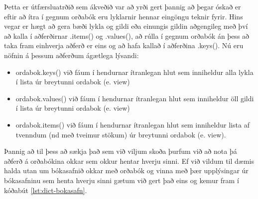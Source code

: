 Þetta er útfærsluatrðið sem ákveðið var að yrði gert þannig að þegar óskað er eftir að ítra í gegnum orðabók eru lyklarnir hennar eingöngu teknir fyrir.
Hins vegar er hægt að gera bæði lykla og gildi eða einungis gildin aðgengileg með því að kalla í aðferðirnar .items() og .values(), að rúlla í gegnum orðabók án þess að taka fram einhverja aðferð er eins og að hafa kallað í aðferðina .keys().
Nú eru nöfnin á þessum aðferðum ágætlega lýsandi:

\begin{itemize}
	\item ordabok.keys() við fáum í hendurnar ítranlegan hlut sem inniheldur alla lykla í lista úr breytunni ordabok (e. view)
	\item ordabok.values() við fáum í hendurnar ítranlegan hlut sem inniheldur öll gildi í lista úr breytunni ordabok (e. view)
	\item ordabok.items() við fáum í hendurnar ítranlegan hlut sem inniheldur lista af tvenndum (nd með tveimur stökum) úr breytunni ordabok (e. view).
\end{itemize}

Þannig að til þess að sækja það sem við viljum skoða þurfum við að nota þá aðferð á orðabókina okkar sem okkur hentar hverju sinni.
Ef við vildum til dæmis halda utan um bókasafnið okkar með orðabók og vinna með þær upplýsingar úr bókasafninu sem henta hverju sinni gætum við gert það eins og kemur fram í kóðabút \ref{lst:dict-bokasafn}.